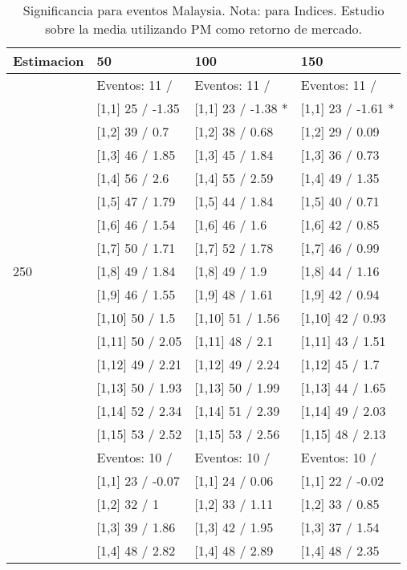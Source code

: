 \begin{table}

\caption{Significancia para eventos Malaysia. Nota: para Indices. Estudio sobre la media utilizando PM como retorno de mercado.}
\centering
\begin{tabular}[t]{llll}
\toprule
Estimacion & 50 & 100 & 150\\
\midrule
 & Eventos:  11 / & Eventos:  11 / & Eventos:  11 /\\
 & {}[1,1] 25  / -1.35 & {}[1,1] 23  / -1.38 * & {}[1,1] 23  / -1.61 *\\
 & {}[1,2] 39  / 0.7 & {}[1,2] 38  / 0.68 & {}[1,2] 29  / 0.09\\
 & {}[1,3] 46  / 1.85 & {}[1,3] 45  / 1.84 & {}[1,3] 36  / 0.73\\
 & {}[1,4] 56  / 2.6 & {}[1,4] 55  / 2.59 & {}[1,4] 49  / 1.35\\
\addlinespace
 & {}[1,5] 47  / 1.79 & {}[1,5] 44  / 1.84 & {}[1,5] 40  / 0.71\\
 & {}[1,6] 46  / 1.54 & {}[1,6] 46  / 1.6 & {}[1,6] 42  / 0.85\\
 & {}[1,7] 50  / 1.71 & {}[1,7] 52  / 1.78 & {}[1,7] 46  / 0.99\\
250 & {}[1,8] 49  / 1.84 & {}[1,8] 49  / 1.9 & {}[1,8] 44  / 1.16\\
 & {}[1,9] 46  / 1.55 & {}[1,9] 48  / 1.61 & {}[1,9] 42  / 0.94\\
\addlinespace
 & {}[1,10] 50  / 1.5 & {}[1,10] 51  / 1.56 & {}[1,10] 42  / 0.93\\
 & {}[1,11] 50  / 2.05 & {}[1,11] 48  / 2.1 & {}[1,11] 43  / 1.51\\
 & {}[1,12] 49  / 2.21 & {}[1,12] 49  / 2.24 & {}[1,12] 45  / 1.7\\
 & {}[1,13] 50  / 1.93 & {}[1,13] 50  / 1.99 & {}[1,13] 44  / 1.65\\
 & {}[1,14] 52  / 2.34 & {}[1,14] 51  / 2.39 & {}[1,14] 49  / 2.03\\
\addlinespace
 & {}[1,15] 53  / 2.52 & {}[1,15] 53  / 2.56 & {}[1,15] 48  / 2.13\\
 & Eventos:  10 / & Eventos:  10 / & Eventos:  10 /\\
 & {}[1,1] 23  / -0.07 & {}[1,1] 24  / 0.06 & {}[1,1] 22  / -0.02\\
 & {}[1,2] 32  / 1 & {}[1,2] 33  / 1.11 & {}[1,2] 33  / 0.85\\
 & {}[1,3] 39  / 1.86 & {}[1,3] 42  / 1.95 & {}[1,3] 37  / 1.54\\
\addlinespace
 & {}[1,4] 48  / 2.82 & {}[1,4] 48  / 2.89 & {}[1,4] 48  / 2.35\\

\end{tabular}
\end{table}
